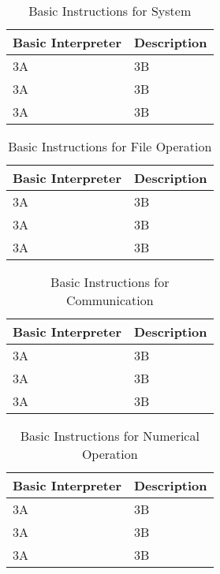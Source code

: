 \documentclass[11pt,fleqn]{book} %
\numberwithin{equation}{section} %
\numberwithin{figure}{section} %
\numberwithin{table}{section} %
\begin{document}
\begin{table}[]
\centering
\caption{Basic Instructions for System}
\label{Basic_Instructions_for_System}
\begin{tabular}{|p{4cm}|p{10cm}|}
\hline
\textbf{Basic Interpreter} & \textbf{Description}                                                             \\ \hline
3A & 3B 
\\ \hline
3A & 3B 
\\ \hline
3A & 3B 
\\ \hline
\end{tabular}
\end{table}


\begin{table}[]
\centering
\caption{Basic Instructions for File Operation}
\label{Basic_Instructions_for_File_Operation}
\begin{tabular}{|p{4cm}|p{10cm}|}
\hline
\textbf{Basic Interpreter} & \textbf{Description}                                                             \\ \hline
3A & 3B 
\\ \hline
3A & 3B 
\\ \hline
3A & 3B 
\\ \hline
\end{tabular}
\end{table}


\begin{table}[]
\centering
\caption{Basic Instructions for Communication}
\label{Basic_Instructions_for_Communication}
\begin{tabular}{|p{4cm}|p{10cm}|}
\hline
\textbf{Basic Interpreter} & \textbf{Description}                                                             \\ \hline
3A & 3B 
\\ \hline
3A & 3B 
\\ \hline
3A & 3B 
\\ \hline
\end{tabular}
\end{table}

\begin{table}[]
\centering
\caption{Basic Instructions for Numerical Operation}
\label{Basic_Instructions_for_Numerical_Operation}
\begin{tabular}{|p{4cm}|p{10cm}|}
\hline
\textbf{Basic Interpreter} & \textbf{Description}                                                             \\ \hline
3A & 3B 
\\ \hline
3A & 3B 
\\ \hline
3A & 3B 
\\ \hline
\end{tabular}
\end{table}
\end{document}
